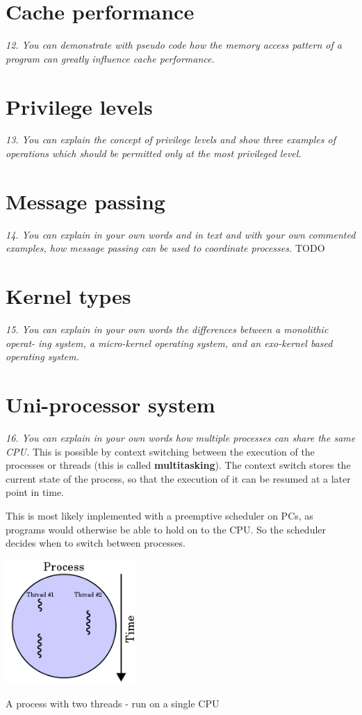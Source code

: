 \documentclass{article}
\begin{document}
\section{Cache performance}
\emph{12. You can demonstrate with pseudo code how the memory access pattern of a program can greatly influence cache performance.}



\section{Privilege levels}
\emph{13. You can explain the concept of privilege levels and show three examples of operations which should be permitted only at the most privileged level.}



\section{Message passing}
\emph{14. You can explain in your own words and in text and with your own commented examples, how message passing can be used to coordinate processes.}
TODO


\section{Kernel types}
\emph{15. You can explain in your own words the differences between a monolithic operat-
ing system, a micro-kernel operating system, and an exo-kernel based operating
system.}



\section{Uni-processor system}
\emph{16. You can explain in your own words how multiple processes can share the same CPU.}
This is possible by context switching between the execution of the processes or threads (this is called \textbf{multitasking}). The context switch stores the current state of the process, so that the execution of it can be resumed at a later point in time.

This is most likely implemented with a preemptive scheduler on PCs, as programs would otherwise be able to hold on to the CPU. So the scheduler decides when to switch between processes.

\begin{center}
\includegraphics[width=5.0cm]{images/220px-Multithreaded_process.png}

A process with two threads - run on a single CPU
\end{center}
\end{document}
